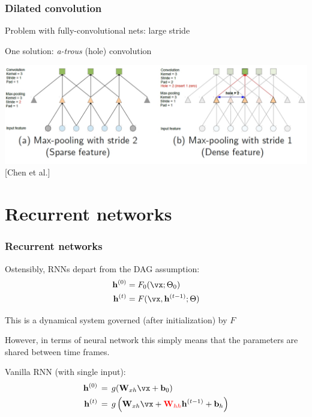 \documentclass[xcolor=dvipsnames]{beamer}
\begin{document}
\begin{frame}
  \frametitle{Dilated convolution}
  \bi
\item Problem with fully-convolutional nets: large stride
\item One solution: \emph{a-trous} (hole) convolution

\includegraphics[width=.8\textwidth]{atrous_example2}
\\{[Chen et al.]}
\ei
\end{frame}

\section{Recurrent networks}


\begin{frame}
  \frametitle{Recurrent networks}  
  \bi
\item Ostensibly, RNNs depart from the DAG assumption:
\begin{align*}
\mathbf{h}^{(0)}&=F_0(\vx;\Theta_0)\\
\mathbf{h}^{(t)}&=F(\vx,\mathbf{h}^{(t-1)};\Theta)
\end{align*}

\item This is a dynamical system governed (after initialization) by
  $F$
\item However, in terms of neural network this simply means that the
  parameters are shared between time frames.
\item Vanilla RNN (with single input):
  \begin{align*}
    \mathbf{h}^{(0)}\,&=\,g(\mathbf{W}_{xh}\vx+\mathbf{b}_0)\\
    \mathbf{h}^{(t)}\,&=\,g\left(\mathbf{W}_{xh}\vx+\textcolor{red}{\mathbf{W}_{hh}}\mathbf{h}^{(t-1)}+\mathbf{b}_h\right)
  \end{align*}
\ei
\end{frame}
\end{document}
